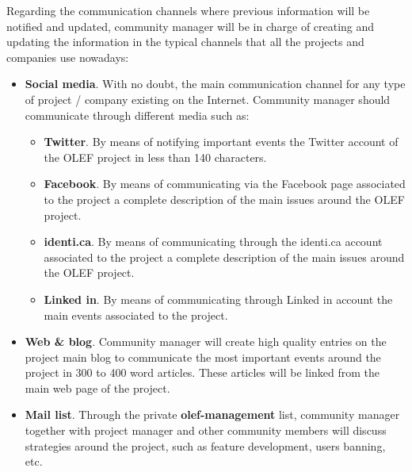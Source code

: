 \documentclass[11pt]{article}
\begin{document}
Regarding the communication channels where previous information will be notified and updated, community manager will be in charge of creating and updating the information in the typical channels that all the projects and companies use nowadays:
\begin{itemize}\itemsep0pt
\item{\textbf{Social media}}. With no doubt, the main communication channel for any type of project / company existing on the Internet. Community manager should communicate through different media such as:
\begin{itemize}\itemsep0pt
\item{\textbf{Twitter}}. By means of notifying important events the Twitter account of the OLEF project in less than 140 characters.
\item{\textbf{Facebook}}. By means of communicating via the Facebook page associated to the project a complete description of the main issues around the OLEF project.
\item{\textbf{identi.ca}}. By means of communicating through the identi.ca account associated to the project a complete description of the main issues around the OLEF project.
\item{\textbf{Linked in}}. By means of communicating through Linked in account the main events associated to the project.
\end{itemize}
\item{\textbf{Web \& blog}}. Community manager will create high quality entries on the project main blog to communicate the most important events around the project in 300 to 400 word articles. These articles will be linked from the main web page of the project.
\item{\textbf{Mail list}}. Through the private \textbf{olef-management} list, community manager together with project manager and other community members will discuss strategies around the project, such as feature development, users banning, etc.
\end{itemize}
\end{document}

